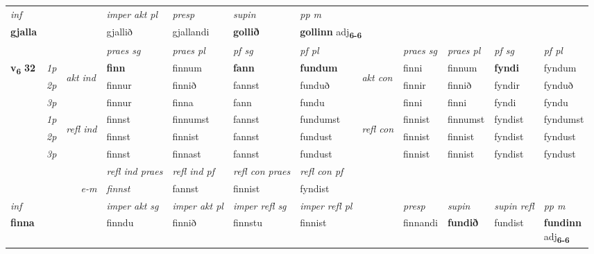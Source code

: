 \begin{longtable}[l]{X>{\footnotesize\itshape}llXXXXlXXXX}
   {\textit{inf}} & &  & \textit{imper akt pl}   & \textit{presp} & \textit{supin}  & \textit{pp m} \\*
  {\textbf{gjalla}} & &  & gjallið   & gjallandi &  \textbf{gollið}  & \multicolumn{2}{l}{\textbf{gollinn} adj\textbf{\textsubscript{6-6}}} \\*

\midrule

 & &   & \textit{praes sg}  & \textit{praes pl}    & \textit{ pf sg} & \textit{pf pl} & & \textit{praes sg}  & \textit{praes pl}    & \textit{pf sg} & \textit{pf pl }  \\ \cmidrule{4-7} \cmidrule{9-12}
 \multirow{2}{*}{{{\textbf{v{\textsubscript{6}}} \Large{\textbf{32}}}}}  & 1p & \multirow{3}{*}{\begin{turn}{90}\textit{akt ind}\end{turn}} & \textbf{finn} & finnum & \textbf{fann} & \textbf{fundum} & \multirow{3}{*}{\begin{turn}{90}\textit{akt con}\end{turn}} &finni & finnum & \textbf{fyndi} & fyndum\\*
 & 2p &  &  finnur  & finnið & fannst & funduð & & finnir & finnið & fyndir & fynduð \\*
 & 3p &  & finnur & finna & fann & fundu & & finni & finni& fyndi & fyndu \\*
\cmidrule{4-7} \cmidrule{9-12}
 & 1p & \multirow{3}{*}{\begin{turn}{90}\textit{refl ind}\end{turn}}  & finnst & finnumst & fannst & fundumst & \multirow{3}{*}{\begin{turn}{90}\textit{refl con}\end{turn}}  &finnist & finnumst & fyndist & fyndumst \\*
 & 2p &  & finnst & finnist & fannst & fundust & &finnist & finnist & fyndist & fyndust \\*
 & 3p  & & finnst & finnast & fannst & fundust & & finnist & finnist& fyndist & fyndust \\*
\cmidrule{4-7} \cmidrule{9-12}

 & && \textit{refl ind praes} & \textit{refl ind pf} & \textit{refl con praes} & \textit{refl con pf} \\*
\multicolumn{3}{r}{\textit{e-m}}& finnst & fannst & finnist & fyndist \\*

\cmidrule{4-7}
   {\textit{inf}} & &  & \textit{imper akt sg} & \textit{imper akt pl} & \textit{imper refl sg} & \textit{imper refl pl} && \textit{presp} & \textit{supin} & \textit{supin refl} & \textit{pp m} \\*
  {\textbf{finna}} & && finndu  & finnið & finnstu & finnist && finnandi &  \textbf{fundið} & fundist & \specialcell{\textbf{fundinn} \\ adj\textbf{\textsubscript{6-6}}} \\*


\end{longtable}

